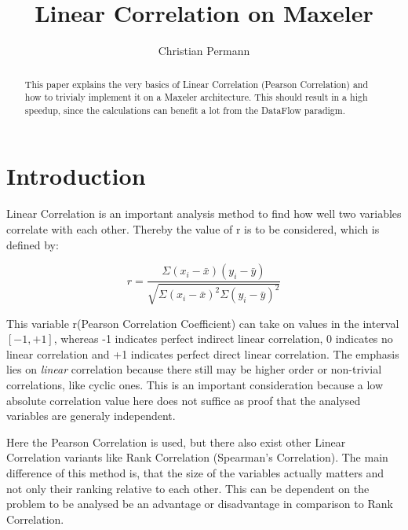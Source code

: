\documentclass{llncs}
\begin{document}
\title{Linear Correlation on Maxeler}

\author{Christian Permann}

\maketitle

\begin{abstract}
This paper explains the very basics of Linear Correlation (Pearson Correlation) and how to trivialy implement it on a Maxeler architecture. This should result in a high speedup, since the calculations can benefit a lot from the DataFlow paradigm.
\end{abstract}

\tableofcontents

\section{Introduction}\label{sec:into}
Linear Correlation is an important analysis method to find how well two variables correlate with each other. Thereby the value of r is to be considered, which is defined by:

$$r = \frac{\Sigma(x_i - \bar{x})(y_i - \bar{y})}{\sqrt{\Sigma(x_i - \bar{x})^2\Sigma(y_i - \bar{y})^2}}$$
\newline

This variable r(Pearson Correlation Coefficient) can take on values in the interval \(\left[-1, +1\right]\), whereas -1 indicates perfect indirect linear correlation, 0 indicates no linear correlation and +1 indicates perfect direct linear correlation. The emphasis lies on \emph{linear} correlation because there still may be higher order or non-trivial correlations, like cyclic ones. This is an important consideration because a low absolute correlation value here does not suffice as proof that the analysed variables are generaly independent. 

Here the Pearson Correlation is used, but there also exist other Linear Correlation variants like Rank Correlation (Spearman's Correlation). The main difference of this method is, that the size of the variables actually matters and not only their ranking relative to each other. This can be dependent on the problem to be analysed be an advantage or disadvantage in comparison to Rank Correlation.
\end{document}
